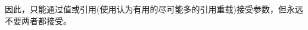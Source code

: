 因此，只能通过值或引用(使用认为有用的尽可能多的引用重载)接受参数，但永远不要两者都接受。



































































